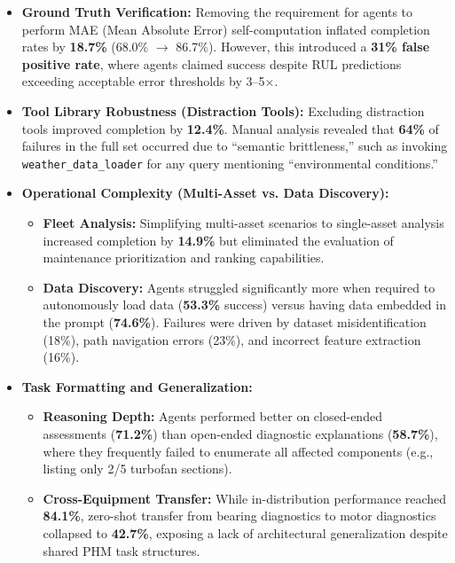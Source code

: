 \documentclass[sigconf,review]{acmart}
\begin{document}
\begin{itemize}
    \item \textbf{Ground Truth Verification:} Removing the requirement for agents to perform MAE (Mean Absolute Error) self-computation inflated completion rates by \textbf{18.7\%} (68.0\% $\rightarrow$ 86.7\%). However, this introduced a \textbf{31\% false positive rate}, where agents claimed success despite RUL predictions exceeding acceptable error thresholds by 3--5$\times$.
    
    \item \textbf{Tool Library Robustness (Distraction Tools):} Excluding distraction tools improved completion by \textbf{12.4\%}. Manual analysis revealed that \textbf{64\%} of failures in the full set occurred due to ``semantic brittleness,'' such as invoking \texttt{weather\_data\_loader} for any query mentioning ``environmental conditions.''
    
    \item \textbf{Operational Complexity (Multi-Asset vs. Data Discovery):}
    \begin{itemize}
        \item \textbf{Fleet Analysis:} Simplifying multi-asset scenarios to single-asset analysis increased completion by \textbf{14.9\%} but eliminated the evaluation of maintenance prioritization and ranking capabilities.
        \item \textbf{Data Discovery:} Agents struggled significantly more when required to autonomously load data (\textbf{53.3\%} success) versus having data embedded in the prompt (\textbf{74.6\%}). Failures were driven by dataset misidentification (18\%), path navigation errors (23\%), and incorrect feature extraction (16\%).
    \end{itemize}

    \item \textbf{Task Formatting and Generalization:}
    \begin{itemize}
        \item \textbf{Reasoning Depth:} Agents performed better on closed-ended assessments (\textbf{71.2\%}) than open-ended diagnostic explanations (\textbf{58.7\%}), where they frequently failed to enumerate all affected components (e.g., listing only 2/5 turbofan sections).
        \item \textbf{Cross-Equipment Transfer:} While in-distribution performance reached \textbf{84.1\%}, zero-shot transfer from bearing diagnostics to motor diagnostics collapsed to \textbf{42.7\%}, exposing a lack of architectural generalization despite shared PHM task structures.
    \end{itemize}
\end{itemize}
\end{document}
